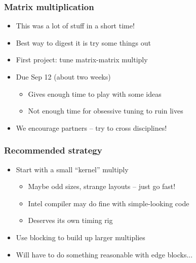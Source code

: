 \documentclass{beamer}
\begin{document}


\begin{frame}
  \frametitle{Matrix multiplication}

  \begin{itemize}
  \item This was a lot of stuff in a short time!
  \item Best way to digest it is try some things out
  \item First project: tune matrix-matrix multiply
  \item Due Sep 12 (about two weeks)
    \begin{itemize}
    \item Gives enough time to play with some ideas
    \item Not enough time for obsessive tuning to ruin lives
    \end{itemize}
  \item We encourage partners -- try to cross disciplines!
  \end{itemize}
\end{frame}


\begin{frame}
  \frametitle{Recommended strategy}

  \begin{itemize}
  \item Start with a small ``kernel'' multiply
    \begin{itemize}
    \item Maybe odd sizes, strange layouts -- just go fast!
    \item Intel compiler may do fine with simple-looking code
    \item Deserves its own timing rig
    \end{itemize}
  \item Use blocking to build up larger multiplies
  \item Will have to do something reasonable with edge blocks...
  \end{itemize}
  
\end{frame}
\end{document}
